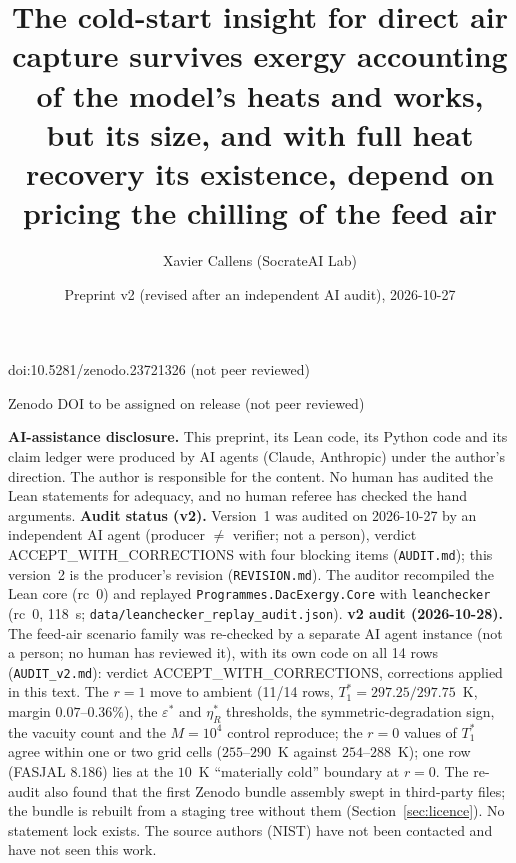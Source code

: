 \documentclass[10pt]{article}
\title{The cold-start insight for direct air capture survives exergy accounting of the model's heats and works,\\
but its size, and with full heat recovery its existence, depend on pricing the chilling of the feed air}
\author{Xavier Callens (SocrateAI Lab)}
\date{Preprint v2 (revised after an independent AI audit), 2026-10-27}
\begin{document}
\maketitle
\begin{center}\small doi:10.5281/zenodo.23721326 \quad (not peer reviewed)\end{center}

\begin{center}\small Zenodo DOI to be assigned on release \quad (not peer reviewed)\end{center}

\noindent\textbf{AI-assistance disclosure.} This preprint, its Lean code, its Python code and its claim ledger were
produced by AI agents (Claude, Anthropic) under the author's direction. The author is responsible for the content. No human
has audited the Lean statements for adequacy, and no human referee has checked the hand arguments.
\textbf{Audit status (v2).} Version~1 was audited on 2026-10-27 by an independent AI agent (producer $\neq$ verifier; not a person),
verdict ACCEPT\_WITH\_CORRECTIONS with four blocking items (\texttt{AUDIT.md}); this version~2 is the producer's revision (\texttt{REVISION.md}). The auditor
recompiled the Lean core (rc~0) and replayed \texttt{Programmes.DacExergy.Core} with \texttt{leanchecker} (rc~0, 118~s; \texttt{data/leanchecker\_replay\_audit.json}).
\textbf{v2 audit (2026-10-28).} The feed-air scenario family was re-checked by a separate AI agent instance (not a person; no human has reviewed it), with its own code on all 14 rows (\texttt{AUDIT\_v2.md}): verdict ACCEPT\_WITH\_CORRECTIONS, corrections applied in this text. The $r=1$ move to ambient (11/14 rows, $T_1^\ast=297.25/297.75$~K, margin $0.07$--$0.36\%$), the $\varepsilon^\ast$ and $\eta_R^\ast$ thresholds, the symmetric-degradation sign, the vacuity count and the $M=10^4$ control reproduce; the $r=0$ values of $T_1^\ast$ agree within one or two grid cells ($255$--$290$~K against $254$--$288$~K); one row (FASJAL 8.186) lies at the $10$~K ``materially cold'' boundary at $r=0$. The re-audit also found that the first Zenodo bundle assembly swept in third-party files; the bundle is rebuilt from a staging tree without them (Section~\ref{sec:licence}). No statement lock exists. The source authors (NIST) have not been contacted and have not seen this work.
\end{document}
